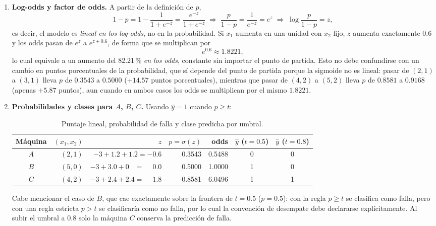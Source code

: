 \begin{enumerate}

\item \textbf{Log-odds y factor de odds.}
A partir de la definición de $p$,
\[
    1-p = 1 - \frac{1}{1+e^{-z}} = \frac{e^{-z}}{1+e^{-z}}
    \;\Longrightarrow\;
    \frac{p}{1-p} = \frac{1}{e^{-z}} = e^{z}
    \;\Longrightarrow\;
    \log\frac{p}{1-p} = z ,
\]
es decir, el modelo es \emph{lineal en los log-odds}, no en la
probabilidad. Si $x_1$ aumenta en una unidad con $x_2$ fijo, $z$ aumenta
exactamente $0.6$ y los odds pasan de $e^{z}$ a $e^{z+0.6}$, de forma que
se multiplican por
\[
    e^{0.6} \approx 1.8221 ,
\]
lo cual equivale a un aumento del 82.21\,\% \emph{en los odds},
constante sin importar el punto de partida. Esto no debe confundirse con
un cambio en puntos porcentuales de la probabilidad, que sí depende del
punto de partida porque la sigmoide no es lineal: pasar de $(2,1)$ a
$(3,1)$ lleva $p$ de $0.3543$ a $0.5000$ ($+14.57$ puntos porcentuales),
mientras que pasar de $(4,2)$ a $(5,2)$ lleva $p$ de $0.8581$ a $0.9168$
(apenas $+5.87$ puntos), aun cuando en ambos casos los odds se
multiplican por el mismo $1.8221$.

\item \textbf{Probabilidades y clases para $A$, $B$, $C$.}
Usando $\hat y=1$ cuando $p\ge t$:

\begin{table}[H]
\centering
\begin{tabular}{crrrrcc}
\toprule
Máquina & $(x_1,x_2)$ & $z$ & $p=\sigma(z)$ & odds & $\hat y$ ($t=0.5$) & $\hat y$ ($t=0.8$) \\
\midrule
$A$ & $(2,1)$ & $-3+1.2+1.2=-0.6$ & 0.3543 & 0.5488 & 0 & 0 \\
$B$ & $(5,0)$ & $-3+3.0+0\phantom{.0}=\phantom{-}0.0$ & 0.5000 & 1.0000 & 1 & 0 \\
$C$ & $(4,2)$ & $-3+2.4+2.4=\phantom{-}1.8$ & 0.8581 & 6.0496 & 1 & 1 \\
\bottomrule
\end{tabular}
\caption{Puntaje lineal, probabilidad de falla y clase predicha por umbral.}
\label{tab:ej3-maquinas}
\end{table}

Cabe mencionar el caso de $B$, que cae exactamente sobre la frontera de
$t=0.5$ ($p=0.5$): con la regla $p\ge t$ se clasifica como falla, pero
con una regla estricta $p>t$ se clasificaría como no falla, por lo cual
la convención de desempate debe declararse explícitamente. Al subir el
umbral a $0.8$ solo la máquina $C$ conserva la predicción de falla.


\end{enumerate}
